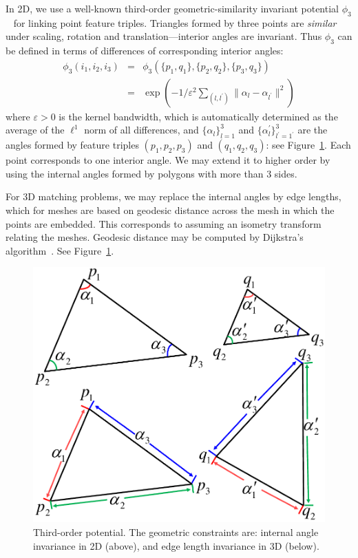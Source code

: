 In 2D, we use a well-known third-order geometric-similarity invariant potential $\phi_3$~\cite{Duchenne09,Chertok10} for linking point feature triples.
Triangles formed by three points are \emph{similar} under scaling, rotation and translation---interior angles are invariant.
Thus $\phi_3$ can be defined in terms of differences of corresponding interior angles:
\begin{eqnarray}
\phi_3(i_1,i_2,i_3)&=&\phi_3(\{p_1,q_1\}, \{p_2,q_2\}, \{p_3,q_3\})\nonumber\\
&=&\exp(-1/\varepsilon^2\sum\nolimits_{(l,l^{'})}\lVert \alpha_l- \alpha_{l^{'} } \lVert^2 )
\end{eqnarray}
where $\varepsilon > 0$ is the kernel bandwidth, which is automatically determined as the average of the $\mathcal{\ell}^1$ norm of all differences,
and $\{\alpha_l\}_{l=1}^3$ and $\{\alpha_l^{'}\}_{l^{'}=1^{'}}^{3}$ are the angles formed by feature triples $(p_1,p_2,p_3)$ and $(q_1,q_2,q_3)$:
see Figure~\ref{fig:TO}. Each point corresponds to one interior angle.
We may extend it to higher order by using the internal angles formed by polygons with more than 3 sides.

For 3D matching problems, we may replace the internal angles by edge lengths, which for meshes are based on geodesic distance across the mesh in which the points are embedded. This corresponds to assuming an isometry transform relating the meshes.
Geodesic distance may be computed by Dijkstra's algorithm~\cite{Peyre2010}.
See  Figure~\ref{fig:TO}.

\begin{figure}
\centering
  \includegraphics[width=0.6\linewidth]{figures/diagram.pdf}
  \caption{Third-order potential. The geometric constraints are: internal angle invariance in 2D (above), and edge length invariance in 3D (below).}
\label{fig:TO}
\end{figure}

